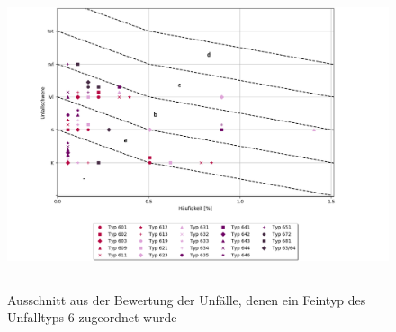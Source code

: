 \begin{savenotes}
	\begin{figure}[H]
		\centering
		\includegraphics[width=13.5cm,height=9cm]{figures/Bewertung_FT6(2)}
		\caption[Ausschnitt aus der Bewertung der Unfälle, denen ein Feintyp des Unfalltyps 6 zugeordnet wurde]{Ausschnitt aus der Bewertung der Unfälle, denen ein Feintyp des Unfalltyps 6 zugeordnet wurde}\label{fig:Bewertung_FT6(2)}
	\end{figure}
\end{savenotes}